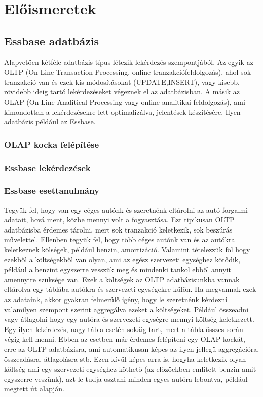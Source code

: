 \chapter{Előismeretek}\label{sect:Preliminaries}
\section{Essbase adatbázis}
Alapvetően kétféle adatbázis típus létezik lekérdezés szempontjából. Az egyik az OLTP (On Line Transaction Processing, online tranzakciófeldolgozás), ahol sok tranzakció van és ezek kis módosításokat (UPDATE,INSERT), vagy kisebb, rövidebb ideig tartó lekérdezéseket végeznek el az adatbázisban. A másik az OLAP (On Line Analitical Processing vagy online analitikai feldolgozás), ami kimondottan a lekérdezésekre lett optimalizálva, jelentések készítésére. Ilyen adatbázis például az Essbase.

\subsection{OLAP kocka felépítése}

\subsection{Essbase lekérdezések}

\subsection{Essbase esettanulmány}
Tegyük fel, hogy van egy céges autónk és szeretnénk eltárolni az autó forgalmi adatait, hová ment, közbe mennyi volt a fogyasztása. Ezt tipikusan OLTP adatbázisba érdemes tárolni, mert sok tranzakció keletkezik, sok beszúrás művelettel. Ellenben tegyük fel, hogy több céges autónk van és az autókra keletkeznek kölségek, például benzin, amortizáció. Valamint tételezzük föl hogy ezekből a költségekből van olyan, ami az egész szervezeti egységhez kötődik, például a benzint egyszerre vesszük meg és mindenki tankol ebből annyit amennyire szüksége van. Ezek a költségek az OLTP adatbázisunkba vannak eltárolva egy táblába autókra és szervezeti egységekre külön. Ha megvannak ezek az adataink, akkor gyakran felmerülő igény, hogy le szeretnénk kérdezni valamilyen szempont szerint aggregálva ezeket a költségeket. Például összeadni vagy átlagolni hogy egy autóra és szervezeti egységre mennyi költség keletkezett. Egy ilyen lekérdezés, nagy tábla esetén sokáig tart, mert a tábla összes során végig kell menni.  Ebben az esetben már érdemes felépíteni egy OLAP kockát, erre az OLTP adatbázisra, ami automatikusan képes az ilyen jellegű aggregációra, összeadásra, átlagolásra stb. Ezen kívűl képes arra is, hogyha keletkezik olyan költség ami egy szervezeti egységhez köthető (az előzőekben említett benzin amit egyszerre veszünk), azt le tudja osztani minden egyes autóra lebontva, például megtett út alapján.


